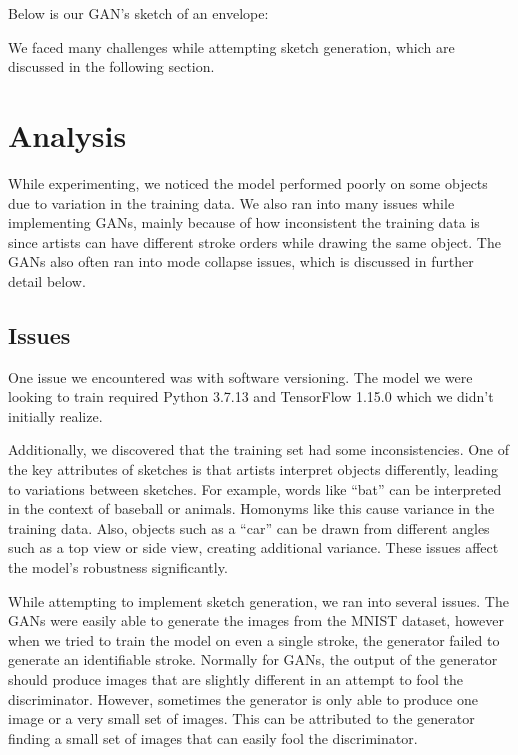 \documentclass[10pt,twocolumn,letterpaper]{article}
\begin{document}
Below is our GAN’s sketch of an envelope:

We faced many challenges while attempting sketch generation, which are discussed in the following section.

\section{Analysis}

While experimenting, we noticed the model performed poorly on some objects due to variation in the training data. We also ran into many issues while implementing GANs, mainly because of how inconsistent the training data is since artists can have different stroke orders while drawing the same object. The GANs also often ran into mode collapse issues, which is discussed in further detail below.

\subsection{Issues}

One issue we encountered was with software versioning. The model we were looking to train required Python 3.7.13 and TensorFlow 1.15.0 which we didn’t initially realize.

Additionally, we discovered that the training set had some inconsistencies. One of the key attributes of sketches is that artists interpret objects differently, leading to variations between sketches. For example, words like ``bat'' can be interpreted in the context of baseball or animals. Homonyms like this cause variance in the training data. Also, objects such as a ``car'' can be drawn from different angles such as a top view or side view, creating additional variance. These issues affect the model’s robustness significantly.

While attempting to implement sketch generation, we ran into several issues. The GANs were easily able to generate the images from the MNIST dataset, however when we tried to train the model on even a single stroke, the generator failed to generate an identifiable stroke. Normally for GANs, the output of the generator should produce images that are slightly different in an attempt to fool the discriminator. However, sometimes the generator is only able to produce one image or a very small set of images. This can be attributed to the generator finding a small set of images that can easily fool the discriminator. 
\end{document}
